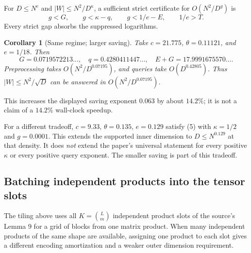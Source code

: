 \documentclass[11pt]{article}
\newtheorem{corollary}[theorem]{Corollary}
\begin{document}
For $D\le N^e$ and $|W|\le N^2/D^\kappa$, a sufficient strict certificate
for $O(N^2/D^g)$ is
\[
g<G,\qquad g<\kappa-q,\qquad g<1/e-E,
\qquad 1/e>T.
\tag{5}
\]
Every strict gap absorbs the suppressed logarithms.

\begin{corollary}[Same regime; larger saving]
Take $c=21.775$, $\theta=0.11121$, and $e=1/18$. Then
\[
G=0.0719572213\ldots,\quad q=0.4280411447\ldots,
\quad E+G=17.9991675570\ldots.
\]
Preprocessing takes $O(N^2/D^{0.07195})$, and queries take
$O(D^{0.42805})$. Thus $|W|\le N^2/\sqrt D$ can be answered in
$O(N^2/D^{0.07195})$.
\end{corollary}
This increases the displayed saving exponent $0.063$ by about $14.2\%$;
it is not a claim of a $14.2\%$ wall-clock speedup.

For a different tradeoff, $c=9.33$, $\theta=0.135$, $e=0.129$ satisfy (5)
with $\kappa=1/2$ and $g=0.0001$. This extends the supported inner dimension
to $D\le N^{0.129}$ at that density. It does \emph{not} extend the paper's
universal statement for every positive $\kappa$ or every positive query
exponent. The smaller saving is part of this tradeoff.

\subsection*{Batching independent products into the tensor slots}
The tiling above uses all $K=\binom Lm$ independent product slots of the
source's Lemma 9 for a grid of blocks from one matrix product. When many
independent products of the same shape are available, assigning one product
to each slot gives a different encoding amortization and a weaker outer
dimension requirement.
\end{document}
